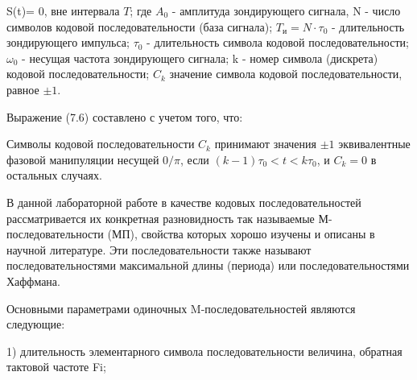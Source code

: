 S(t)= 0, вне интервала $T$; где $A_{0}$ - амплитуда зондирующего сигнала, N - число символов кодовой последовательности (база сигнала); $T_{и} = N \cdot \tau_{0}$ - длительность зондирующего импульса; $\tau_{0}$ - длительность символа кодовой последовательности;  $\omega_{0}$ - несущая частота зондирующего сигнала; k - номер символа (дискрета) кодовой последовательности; $C_{k}$ значение символа кодовой последовательности, равное $\pm1$.

Выражение (7.6) составлено с учетом того, что:

Символы кодовой последовательности $C_{k}$ принимают значения $\pm1$ эквивалентные фазовой манипуляции несущей $0/\pi$, если $(k - 1)\tau_{0} < t < k\tau_{0}$, и $C_{k} = 0$ в остальных случаях.

В данной лабораторной работе в качестве кодовых последовательностей рассматривается их конкретная разновидность так называемые М-последовательности (МП), свойства которых хорошо изучены и описаны в научной литературе. Эти последовательности также называют последовательностями максимальной длины (периода) или последовательностями Хаффмана.

Основными параметрами одиночных M-последовательностей являются следующие:

1) длительность элементарного символа последовательности величина, обратная тактовой частоте Fi;

